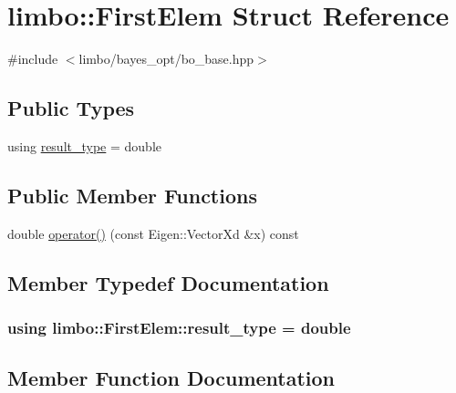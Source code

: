 \hypertarget{structlimbo_1_1_first_elem}{}\section{limbo\+:\+:First\+Elem Struct Reference}
\label{structlimbo_1_1_first_elem}


{\ttfamily \#include $<$limbo/bayes\+\_\+opt/bo\+\_\+base.\+hpp$>$}

\subsection*{Public Types}
\begin{DoxyCompactItemize}
\item 
using \hyperlink{structlimbo_1_1_first_elem_a615df66bdce08d6cb405fbe4710e3953}{result\+\_\+type} = double
\end{DoxyCompactItemize}
\subsection*{Public Member Functions}
\begin{DoxyCompactItemize}
\item 
double \hyperlink{structlimbo_1_1_first_elem_a6816ea8e21acec76f91542776ab02422}{operator()} (const Eigen\+::\+Vector\+Xd \&x) const 
\end{DoxyCompactItemize}


\subsection{Member Typedef Documentation}
\hypertarget{structlimbo_1_1_first_elem_a615df66bdce08d6cb405fbe4710e3953}{}
\subsubsection[{result\+\_\+type}]{\setlength{\rightskip}{0pt plus 5cm}using {\bf limbo\+::\+First\+Elem\+::result\+\_\+type} =  double}\label{structlimbo_1_1_first_elem_a615df66bdce08d6cb405fbe4710e3953}


\subsection{Member Function Documentation}
\hypertarget{structlimbo_1_1_first_elem_a6816ea8e21acec76f91542776ab02422}{}
